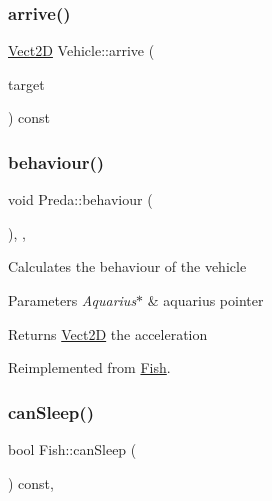 \subsubsection{\texorpdfstring{arrive()}{arrive()}}
{\footnotesize\ttfamily \hyperlink{classVect2D}{Vect2D} Vehicle\+::arrive (\begin{DoxyParamCaption}\item[{const \hyperlink{classVect2D}{Vect2D} \&}]{target }\end{DoxyParamCaption}) const\hspace{0.3cm}{\ttfamily [inherited]}}

\mbox{\label{classPreda_a5c0724c3854a2fff92f3c2308514c89e_a5c0724c3854a2fff92f3c2308514c89e}} 
\subsubsection{\texorpdfstring{behaviour()}{behaviour()}}
{\footnotesize\ttfamily void Preda\+::behaviour (\begin{DoxyParamCaption}\item[{\hyperlink{classAquarius}{Aquarius} $\ast$}]{ }\end{DoxyParamCaption})\hspace{0.3cm}{\ttfamily [override]}, {\ttfamily [protected]}, {\ttfamily [virtual]}}

Calculates the behaviour of the vehicle 
\begin{DoxyParams}{Parameters}
{\em Aquarius$\ast$} & aquarius pointer \\
\hline
\end{DoxyParams}
\begin{DoxyReturn}{Returns}
\hyperlink{classVect2D}{Vect2D} the acceleration 
\end{DoxyReturn}


Reimplemented from \hyperlink{classFish_abffd423bc7a7730aafa80ec9c0cec9a0_abffd423bc7a7730aafa80ec9c0cec9a0}{Fish}.

\mbox{\label{classFish_a9a94edb09498e8d0d2381c2cc3e2e9dc_a9a94edb09498e8d0d2381c2cc3e2e9dc}} 
\subsubsection{\texorpdfstring{can\+Sleep()}{canSleep()}}
{\footnotesize\ttfamily bool Fish\+::can\+Sleep (\begin{DoxyParamCaption}{ }\end{DoxyParamCaption}) const\hspace{0.3cm}{\ttfamily [virtual]}, {\ttfamily [inherited]}}

